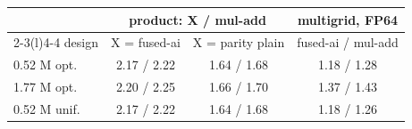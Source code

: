 \begin{tabular}{@{}lccc@{}}
\toprule
& \multicolumn{2}{c}{product: X / mul-add} & multigrid, FP64 \\
\cmidrule(lr){2-3}\cmidrule(l){4-4}
design & X = fused-ai & X = parity plain & fused-ai / mul-add \\
\midrule
0.52 M opt. & 2.17 / 2.22 & 1.64 / 1.68 & 1.18 / 1.28 \\
1.77 M opt. & 2.20 / 2.25 & 1.66 / 1.70 & 1.37 / 1.43 \\
0.52 M unif. & 2.17 / 2.22 & 1.64 / 1.68 & 1.18 / 1.26 \\
\bottomrule
\end{tabular}
